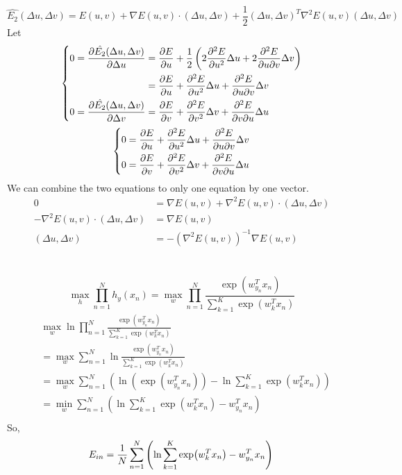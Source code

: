 \documentclass[12pt,a4paper]{article}
\begin{document}
\[
	\hat{{E}_2}(\Delta u,\Delta v)
		= E(u, v) + \nabla E(u, v) \cdot (\Delta u, \Delta v)
		+ \frac{1}{2} {(\Delta u, \Delta v)}^{T} {\nabla}^{2}E(u, v) (\Delta u, \Delta v)
\]
Let
\[
	\left\{
		\begin{aligned}
			0 = \pdv{\hat{{E}_2}(\Delta u,\Delta v)}{\Delta u}
				&= \pdv{E}{u} + \frac{1}{2}\left( 2 \pdv[2]{E}{u} \Delta u + 2 \pdv{E}{u}{v} \Delta v \right) \\
				&= \pdv{E}{u} + \pdv[2]{E}{u} \Delta u + \pdv{E}{u}{v} \Delta v \\
			0 = \pdv{\hat{{E}_2}(\Delta u,\Delta v)}{\Delta v}
				&= \pdv{E}{v} + \pdv[2]{E}{v} \Delta v + \pdv{E}{v}{u} \Delta u \\
		\end{aligned}
	\right.
\]
\[
	\left\{
		\begin{aligned}
			0 &= \pdv{E}{u} + \pdv[2]{E}{u} \Delta u + \pdv{E}{u}{v} \Delta v \\
			0 &= \pdv{E}{v} + \pdv[2]{E}{v} \Delta v + \pdv{E}{v}{u} \Delta u \\
		\end{aligned}
	\right.
\]
We can combine the two equations to only one equation by one vector.
\[
	\begin{aligned}
		0 &= \nabla E(u, v) + {\nabla}^{2} E(u, v) \cdot (\Delta u, \Delta v) \\
		- {\nabla}^{2} E(u, v) \cdot (\Delta u, \Delta v) &= \nabla E(u, v) \\
		(\Delta u, \Delta v) &= - {\left({\nabla}^{2} E(u, v)\right)}^{-1} \nabla E(u, v)
	\end{aligned}
\]

\section{} %

\[
		\max_{h} \prod_{n=1}^{N} h_{y}\left(x_{n}\right) 
		= \max_{w} \prod_{n=1}^{N}
			\frac{\exp({w}_{y_{n}}^{T}x_{n})}{\sum_{k=1}^{K} \exp({w}_{k}^{T}x_{n})}
\]
\[
	\begin{aligned}
		& \max_{w} \ln \prod_{n=1}^{N}
			\frac{\exp({w}_{y_{n}}^{T}x_{n})}{\sum_{k=1}^{K} \exp({w}_{k}^{T}x_{n})} \\
		&= \max_{w} \sum_{n=1}^{N} \ln
			\frac{\exp({w}_{y_{n}}^{T}x_{n})}{\sum_{k=1}^{K} \exp({w}_{k}^{T}x_{n})} \\
		&= \max_{w} \sum_{n=1}^{N} \left( \ln( \exp({w}_{y_{n}}^{T}x_{n}) ) -
			\ln\sum_{k=1}^{K} \exp({w}_{k}^{T}x_{n}) \right) \\
		&= \min_{w} \sum_{n=1}^{N} \left( \ln\sum_{k=1}^{K} \exp({w}_{k}^{T}x_{n}) -
			{w}_{y_{n}}^{T}x_{n} \right) \\
	\end{aligned}
\]
So, 
\[
	E_{in} = \frac{1}{N} \sum_{n=1}^{N} \left( \ln \sum_{k=1}^{K} \exp({w}_{k}^{T}x_{n}) -
		{w}_{y_{n}}^{T}x_{n} \right) \\
\]
\end{document}
